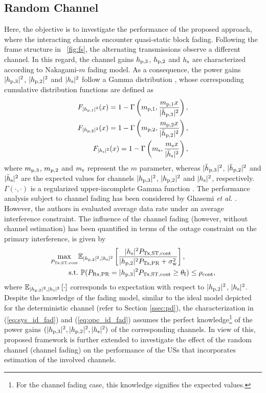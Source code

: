 \subsection{Random Channel}\label{ssec:ltpa}
Here, the objective is to investigate the performance of the proposed approach, where the interacting channels encounter quasi-static block fading. Following the frame structure in \figurename~\ref{fig:fs}, the alternating transmissions observe a different channel. In this regard, the channel gains $h_{\text{p,3}}$, $h_{\text{p,2}}$ and $h_{\text{s}}$ are characterized according to Nakagami-$m$ fading model. As a consequence, the power gains $|h_{\text{p,3}}|^2$, $|h_{\text{p,2}}|^2$ and $|h_{\text{s}}|^2$ follow a Gamma distribution \cite{Goldsmith05}, whose corresponding cumulative distribution functions are defined as  
\begin{align}
F_{|h_{\text{p,1}}|^2}(x) = 1 - \Gamma\left(m_{\text{p,1}}, \frac{m_{\text{p,1}} x}{|\bar{h}_{\text{p,3}}|^2}\right), \label{eq:dis_pgpth}\\
F_{|h_{\text{p,2}}|^2}(x) = 1 - \Gamma\left(m_{\text{p,2}}, \frac{m_{\text{p,2}} x}{|\bar{h}_{\text{p,2}}|^2}\right), \label{eq:dis_pgpt}\\  
F_{|h_{\text{s}}|^2}(x) = 1 - \Gamma\left(m_{\text{s}} , \frac{m_{\text{s}} x}{|\bar{h}_{\text{s}}|^2}\right), \label{eq:dis_pgs}
\end{align}
where $m_{\text{p,3}}$, $m_{\text{p,2}}$ and $m_{\text{s}}$ represent the $m$ parameter, whereas $|\bar{h}_{\text{p,3}}|^2$, $|\bar{h}_{\text{p,2}}|^2$ and $|\bar{h}_{\text{s}}|^2$ are the expected values for channels $|h_{\text{p,3}}|^2$, $|h_{\text{p,2}}|^2$ and $|h_{\text{s}}|^2$, respectively. $\Gamma(\cdot, \cdot)$ is a regularized upper-incomplete Gamma function \cite{abramo}.
The performance analysis subject to channel fading has been considered by Ghasemi \textit{et al.} \cite{Ghasemi06, Ghasemi07}. However, the authors in \cite{Ghasemi06, Ghasemi07} evaluated average data rate under an average interference constraint. The influence of the channel fading (however, without channel estimation) has been quantified in terms of the outage constraint on the primary interference, is given by %
\begin{align}
	\max_{P_{\text{Tx,ST,cont}}} & {\mathbb E}_{|h_{\text{p,2}}|^2, |h_{\text{s}}|^2 }\left[  \frac{|h_{\text{s}}|^2 P_{\text{Tx,ST,cont}}}{|h_{\text{p,2}}|^2 P_{\text{Tx,PR}} + \sigma^2_{\text{w}}} \right] \label{eq:sys_id_fad}, \\
	\text{s.t.} & \text{ } \mathbb P(P_{\text{Rx,PR}}= |h_{\text{p,3}}|^2 P_{\text{Tx,ST,cont}} \ge \theta_{\text{I}}) \le \rho_{\text{cont}}, \label{eq:opc_id_fad} 
\end{align}
where ${\mathbb E}_{|h_{\text{p,2}}|^2, |h_{\text{s}}|^2}\left[ \cdot \right]$ corresponds to expectation with respect to $|h_{\text{p,2}}|^2$, $|h_{\text{s}}|^2$.
Despite the knowledge of the fading model, similar to the ideal model depicted for the deterministic channel (refer to Section \ref{ssec:pd}), the characterization in (\ref{eq:sys_id_fad}) and (\ref{eq:opc_id_fad}) assumes the perfect knowledge\footnote{For the channel fading case, this knowledge signifies the expected values.} of the power gains $(|h_{\text{p,3}}|^2, |h_{\text{p,2}}|^2, |h_{\text{s}}|^2)$ of the corresponding channels. In view of this, proposed framework is further extended to investigate the effect of the random channel (channel fading) on the performance of the USs that incorporates estimation of the involved channels.

